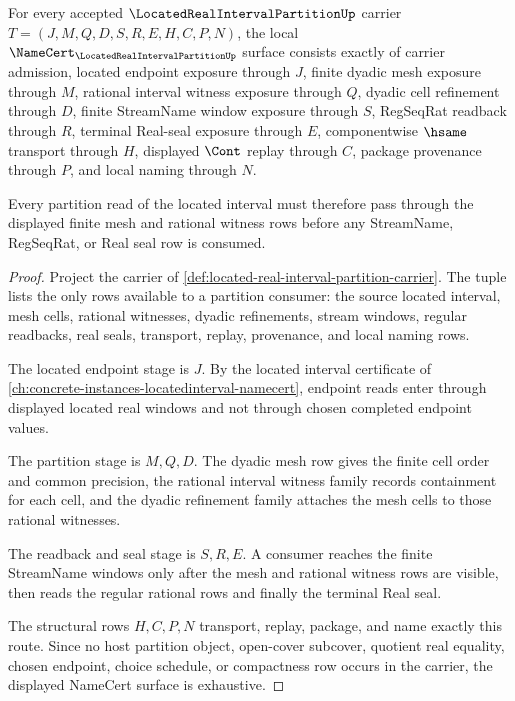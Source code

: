 \begin{theorem}
\label{thm:located-real-interval-partition-namecert-obligations}
For every accepted $\LocatedRealIntervalPartitionUp$ carrier $T=(J,M,Q,D,S,R,E,H,C,P,N)$, the local $\NameCert_{\LocatedRealIntervalPartitionUp}$ surface consists exactly of carrier admission, located endpoint exposure through $J$, finite dyadic mesh exposure through $M$, rational interval witness exposure through $Q$, dyadic cell refinement through $D$, finite StreamName window exposure through $S$, RegSeqRat readback through $R$, terminal Real-seal exposure through $E$, componentwise $\hsame$ transport through $H$, displayed $\Cont$ replay through $C$, package provenance through $P$, and local naming through $N$.

Every partition read of the located interval must therefore pass through the displayed finite mesh and rational witness rows before any StreamName, RegSeqRat, or Real seal row is consumed.
\end{theorem}
\begin{proof}
Project the carrier of \autoref{def:located-real-interval-partition-carrier}. The tuple lists the only rows available to a partition consumer: the source located interval, mesh cells, rational witnesses, dyadic refinements, stream windows, regular readbacks, real seals, transport, replay, provenance, and local naming rows.

The located endpoint stage is $J$. By the located interval certificate of \autoref{ch:concrete-instances-locatedinterval-namecert}, endpoint reads enter through displayed located real windows and not through chosen completed endpoint values.

The partition stage is $M,Q,D$. The dyadic mesh row gives the finite cell order and common precision, the rational interval witness family records containment for each cell, and the dyadic refinement family attaches the mesh cells to those rational witnesses.

The readback and seal stage is $S,R,E$. A consumer reaches the finite StreamName windows only after the mesh and rational witness rows are visible, then reads the regular rational rows and finally the terminal Real seal.

The structural rows $H,C,P,N$ transport, replay, package, and name exactly this route. Since no host partition object, open-cover subcover, quotient real equality, chosen endpoint, choice schedule, or compactness row occurs in the carrier, the displayed NameCert surface is exhaustive.
\end{proof}

